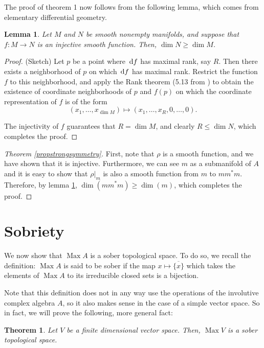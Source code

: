 \documentclass{article}
\theoremstyle{plain}
\newtheorem{theorem}{Theorem}
\newtheorem{lemma}{Lemma}
\theoremstyle{nonumberplain}
\newtheorem{proof}{Proof}
\DeclareMathOperator{\Max}{Max}
\begin{document}
The proof of theorem 1 now follows from the following lemma, which comes from elementary differential geometry.

\begin{lemma}\label{lemma1}
Let $M$ and $N$ be smooth nonempty manifolds, and suppose that $f \colon M \to N$ is an injective smooth function. Then, $\dim N \geq \dim M$.
\end{lemma}

\begin{proof} (Sketch)
Let $p$ be a point where $\dl f$ has maximal rank, say $R$. Then there exists a neighborhood of $p$ on which $\dl f$ has maximal rank. Restrict the function $f$ to this neighborhood, and apply the Rank theorem (5.13 from \cite{leesmooth}) to obtain the existence of coordinate neighborhoods of $p$ and $f(p)$ on which the coordinate representation of $f$ is of the form
\begin{equation}
(x_1, \dots, x_{\dim M}) \mapsto (x_1, \dots, x_R, 0, \dots, 0).
\end{equation}

The injectivity of $f$ guarantees that $R = \dim M$, and clearly $R \leq \dim N$, which completes the proof.
\end{proof}

\begin{proof}[Theorem \ref{propstrongsymmetry}]
First, note that $\rho$ is a smooth function, and we have shown that it is injective. Furthermore, we can see $m$ as a submanifold of $A$ and it is easy to show that $\rho|_m$ is also a smooth function from $m$ to $m m^* m$. Therefore, by lemma \ref{lemma1}, $\dim(m m^* m) \geq \dim(m)$, which completes the proof.
\end{proof}

\section{Sobriety}

We now show that $\Max A$ is a sober topological space. To do so, we recall the definition: $\Max A$ is said to be sober if the map $x \mapsto \overline{\{x\}}$ which takes the elements of $\Max A$ to its irreducible closed sets is a bijection.

Note that this definition does not in any way use the operations of the involutive complex algebra $A$, so it also makes sense in the case of a simple vector space. So in fact, we will prove the following, more general fact:

\begin{theorem}
Let $V$ be a finite dimensional vector space. Then, $\Max V$ is a sober topological space.
\end{theorem}
\end{document}
